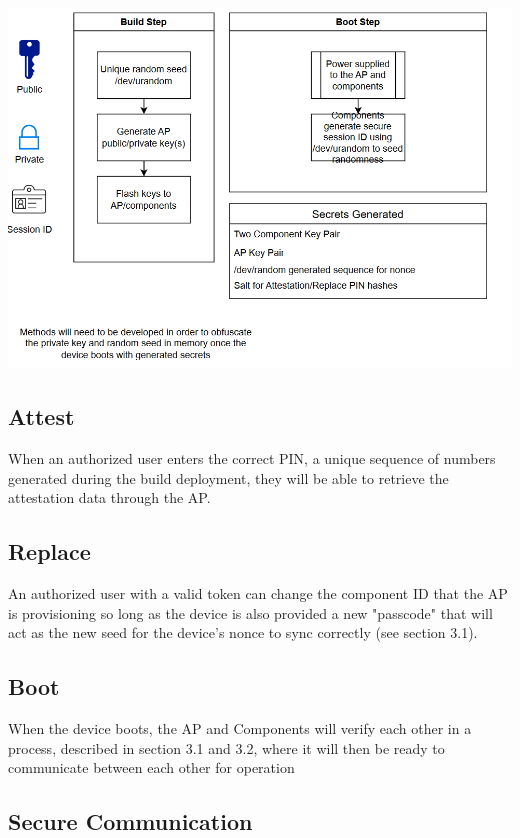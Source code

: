 \documentclass{prace}
\begin{document}
 

\includegraphics[scale=0.75]{./diagramSR1.png}

\subsection{Attest}

When an authorized user enters the correct PIN, a unique sequence of numbers generated during the build deployment, they will be able to 
retrieve the attestation data through the AP.

\subsection{Replace}

An authorized user with a valid token can change the component ID that the AP is provisioning so long as the device is also provided a new "passcode" that 
will act as the new seed for the device's nonce to sync correctly (see section 3.1).

\subsection{Boot}

When the device boots, the AP and Components will verify each other in a process, described in section 3.1 and 3.2, where it will then be ready to communicate between each other for operation

\subsection{Secure Communication}
\end{document}

